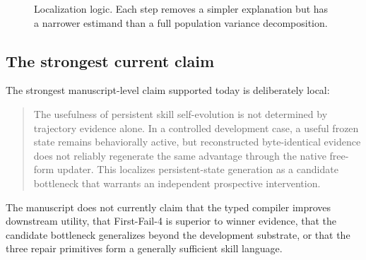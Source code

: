 \begin{figure}[t]
\centering
{}
\caption{Localization logic. Each step removes a simpler explanation but has a narrower estimand than a full population variance decomposition.}
\label{fig:localization}
\end{figure}

\subsection{The strongest current claim}
The strongest manuscript-level claim supported today is deliberately local:

\begin{quote}
The usefulness of persistent skill self-evolution is not determined by trajectory evidence alone. In a controlled development case, a useful frozen state remains behaviorally active, but reconstructed byte-identical evidence does not reliably regenerate the same advantage through the native free-form updater. This localizes persistent-state generation as a candidate bottleneck that warrants an independent prospective intervention.
\end{quote}

The manuscript does not currently claim that the typed compiler improves downstream utility, that First-Fail-4 is superior to winner evidence, that the candidate bottleneck generalizes beyond the development substrate, or that the three repair primitives form a generally sufficient skill language.

